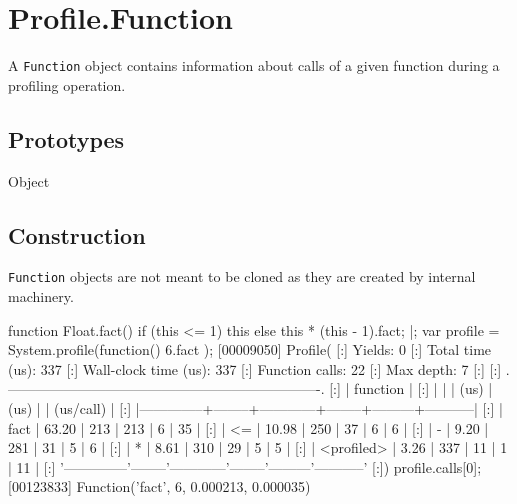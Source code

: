 

\section{Profile.Function}

A \lstinline|Function| object contains information about calls of a
given function during a profiling operation.

\subsection{Prototypes}

\begin{refObjects}
\item[Object]
\end{refObjects}

\subsection{Construction}

\lstinline|Function| objects are not meant to be cloned as they are
created by  internal machinery.

\begin{urbiscript}
function Float.fact()
{
  if (this <= 1)
    this
  else
    this * (this - 1).fact;
}|;
var profile = System.profile(function() { 6.fact });
[00009050] Profile(
[:]  Yields:                    0
[:]  Total time (us):         337
[:]  Wall-clock time (us):    337
[:]  Function calls:           22
[:]  Max depth:                 7
[:]
[:]  .-------------------------------------------------------------------.
[:]  |   function   |   %
[:]  |              |        |    (us)    |  (us)  |         | (us/call) |
[:]  |--------------+--------+------------+--------+---------+-----------|
[:]  |         fact |  63.20 |        213 |    213 |       6 |        35 |
[:]  |           <= |  10.98 |        250 |     37 |       6 |         6 |
[:]  |            - |   9.20 |        281 |     31 |       5 |         6 |
[:]  |            * |   8.61 |        310 |     29 |       5 |         5 |
[:]  |   <profiled> |   3.26 |        337 |     11 |       1 |        11 |
[:]  '--------------'--------'------------'--------'---------'-----------'
[:])
profile.calls[0];
[00123833] Function('fact', 6, 0.000213, 0.000035)
\end{urbiscript}

